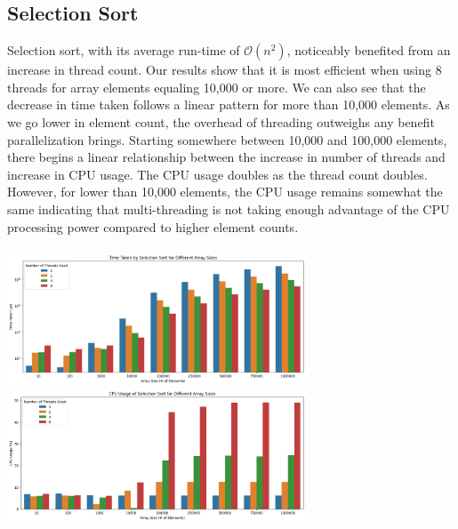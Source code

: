 \documentclass[conference]{IEEEtran}
\begin{document}
\subsection{Selection Sort}
Selection sort, with its average run-time of $\mathcal{O}(n^2)$, noticeably benefited from an increase in thread count. Our results show that it is most efficient when using 8 threads for array elements equaling 10,000 or more. We can also see that the decrease in time taken follows a linear pattern for more than 10,000 elements. As we go lower in element count, the overhead of threading outweighs any benefit parallelization brings. Starting somewhere between 10,000 and 100,000 elements, there begins a linear relationship between the increase in number of threads and increase in CPU usage. The CPU usage doubles as the thread count doubles. However, for lower than 10,000 elements, the CPU usage remains somewhat the same indicating that multi-threading is not taking enough advantage of the CPU processing power compared to higher element counts.
\\\\
\includegraphics[width=3.5in]{SelectionSortTimeTaken.png}
\includegraphics[width=3.5in]{SelectionSortCPUUsage.png}
\end{document}

